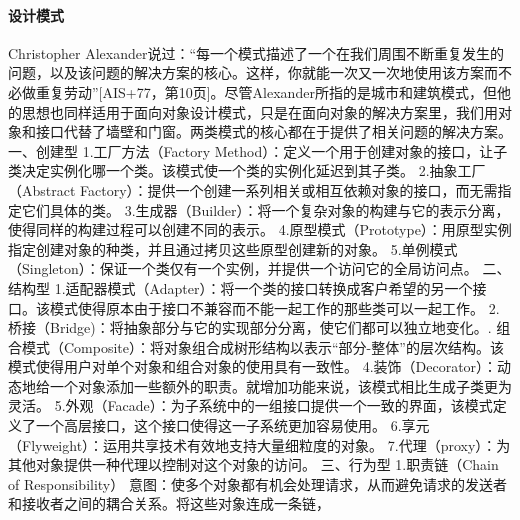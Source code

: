 \documentclass{book}
\begin{document}
\paragraph{设计模式}Christopher Alexander说过：“每一个模式描述了一个在我们周围不断重复发生的问题，以及该问题的解决方案的核心。这样，你就能一次又一次地使用该方案而不必做重复劳动”[AIS+77，第10页]。尽管Alexander所指的是城市和建筑模式，但他的思想也同样适用于面向对象设计模式，只是在面向对象的解决方案里，我们用对象和接口代替了墙壁和门窗。两类模式的核心都在于提供了相关问题的解决方案。\newline
一、创建型\newline
1.工厂方法（Factory Method）：定义一个用于创建对象的接口，让子类决定实例化哪一个类。该模式使一个类的实例化延迟到其子类。\newline
2.抽象工厂（Abstract Factory）：提供一个创建一系列相关或相互依赖对象的接口，而无需指定它们具体的类。\newline
3.生成器（Builder）：将一个复杂对象的构建与它的表示分离，使得同样的构建过程可以创建不同的表示。\newline
4.原型模式（Prototype）：用原型实例指定创建对象的种类，并且通过拷贝这些原型创建新的对象。\newline
5.单例模式（Singleton）：保证一个类仅有一个实例，并提供一个访问它的全局访问点。\newline
二、结构型\newline
1.适配器模式（Adapter）：将一个类的接口转换成客户希望的另一个接口。该模式使得原本由于接口不兼容而不能一起工作的那些类可以一起工作。\newline
2.桥接（Bridge)：将抽象部分与它的实现部分分离，使它们都可以独立地变化。. 组合模式（Composite）：将对象组合成树形结构以表示“部分-整体”的层次结构。该模式使得用户对单个对象和组合对象的使用具有一致性。\newline
4.装饰（Decorator）：动态地给一个对象添加一些额外的职责。就增加功能来说，该模式相比生成子类更为灵活。\newline
5.外观（Facade）：为子系统中的一组接口提供一个一致的界面，该模式定义了一个高层接口，这个接口使得这一子系统更加容易使用。\newline
6.享元（Flyweight）：运用共享技术有效地支持大量细粒度的对象。\newline
7.代理（proxy）：为其他对象提供一种代理以控制对这个对象的访问。\newline
三、行为型\newline
1.职责链（Chain of Responsibility）\newline
意图：使多个对象都有机会处理请求，从而避免请求的发送者和接收者之间的耦合关系。将这些对象连成一条链，
\end{document}
